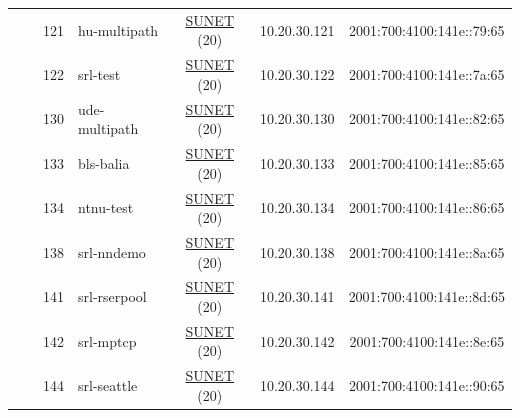 \begin{small}
\begin{center}
\begin{longtable}{|c|c|c|c|c|c|c|c|}
  &  & \tiny{121} & \multicolumn{1}{|l|}{\tiny{hu-multipath}} & \multicolumn{2}{|c|}{\tiny{\href{http://www.sunet.se}{SUNET} (20)}} & \tiny{10.20.30.121} & \tiny{2001:700:4100:141e::79:65} \\* \cline{3-3}\cline{4-4}\cline{5-5}\cline{6-6}\cline{7-7}\cline{8-8}
  &  & \tiny{122} & \multicolumn{1}{|l|}{\tiny{srl-test}} & \multicolumn{2}{|c|}{\tiny{\href{http://www.sunet.se}{SUNET} (20)}} & \tiny{10.20.30.122} & \tiny{2001:700:4100:141e::7a:65} \\* \cline{3-3}\cline{4-4}\cline{5-5}\cline{6-6}\cline{7-7}\cline{8-8}
  &  & \tiny{130} & \multicolumn{1}{|l|}{\tiny{ude-multipath}} & \multicolumn{2}{|c|}{\tiny{\href{http://www.sunet.se}{SUNET} (20)}} & \tiny{10.20.30.130} & \tiny{2001:700:4100:141e::82:65} \\* \cline{3-3}\cline{4-4}\cline{5-5}\cline{6-6}\cline{7-7}\cline{8-8}
  &  & \tiny{133} & \multicolumn{1}{|l|}{\tiny{bls-balia}} & \multicolumn{2}{|c|}{\tiny{\href{http://www.sunet.se}{SUNET} (20)}} & \tiny{10.20.30.133} & \tiny{2001:700:4100:141e::85:65} \\* \cline{3-3}\cline{4-4}\cline{5-5}\cline{6-6}\cline{7-7}\cline{8-8}
  &  & \tiny{134} & \multicolumn{1}{|l|}{\tiny{ntnu-test}} & \multicolumn{2}{|c|}{\tiny{\href{http://www.sunet.se}{SUNET} (20)}} & \tiny{10.20.30.134} & \tiny{2001:700:4100:141e::86:65} \\* \cline{3-3}\cline{4-4}\cline{5-5}\cline{6-6}\cline{7-7}\cline{8-8}
  &  & \tiny{138} & \multicolumn{1}{|l|}{\tiny{srl-nndemo}} & \multicolumn{2}{|c|}{\tiny{\href{http://www.sunet.se}{SUNET} (20)}} & \tiny{10.20.30.138} & \tiny{2001:700:4100:141e::8a:65} \\* \cline{3-3}\cline{4-4}\cline{5-5}\cline{6-6}\cline{7-7}\cline{8-8}
  &  & \tiny{141} & \multicolumn{1}{|l|}{\tiny{srl-rserpool}} & \multicolumn{2}{|c|}{\tiny{\href{http://www.sunet.se}{SUNET} (20)}} & \tiny{10.20.30.141} & \tiny{2001:700:4100:141e::8d:65} \\* \cline{3-3}\cline{4-4}\cline{5-5}\cline{6-6}\cline{7-7}\cline{8-8}
  &  & \tiny{142} & \multicolumn{1}{|l|}{\tiny{srl-mptcp}} & \multicolumn{2}{|c|}{\tiny{\href{http://www.sunet.se}{SUNET} (20)}} & \tiny{10.20.30.142} & \tiny{2001:700:4100:141e::8e:65} \\* \cline{3-3}\cline{4-4}\cline{5-5}\cline{6-6}\cline{7-7}\cline{8-8}
  &  & \tiny{144} & \multicolumn{1}{|l|}{\tiny{srl-seattle}} & \multicolumn{2}{|c|}{\tiny{\href{http://www.sunet.se}{SUNET} (20)}} & \tiny{10.20.30.144} & \tiny{2001:700:4100:141e::90:65} \\* \cline{3-3}\cline{4-4}\cline{5-5}\cline{6-6}\cline{7-7}\cline{8-8}

\end{longtable}
\end{center}
\end{small}
